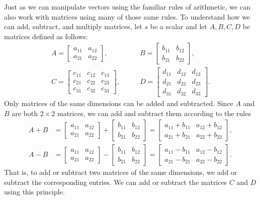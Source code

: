 Just as we can manipulate vectors using the familiar rules of
arithmetic, we can also work with matrices using many of those same
rules. To understand how we can add, subtract, and multiply matrices,
let $s$ be a scalar and let $A,B,C,D$ be matrices defined as follows:
%
\begin{align*}
A
=
\begin{bmatrix}
a_{11} & a_{12} \\
a_{21} & a_{22}
\end{bmatrix},
&\qquad
B
=
\begin{bmatrix}
b_{11} & b_{12} \\
b_{21} & b_{22}
\end{bmatrix}, \\[4pt]
%
C
=
\begin{bmatrix}
c_{11} & c_{12} & c_{13} \\
c_{21} & c_{22} & c_{23} \\
c_{31} & c_{32} & c_{33}
\end{bmatrix},
&\qquad
D
=
\begin{bmatrix}
d_{11} & d_{12} & d_{13} \\
d_{21} & d_{22} & d_{23} \\
d_{31} & d_{32} & d_{33}
\end{bmatrix}.
\end{align*}
%
Only matrices of the same dimensions can be added and
subtracted. Since $A$ and $B$ are both $2 \times 2$ matrices, we can
add and subtract them according to the rules
%
\begin{align*}
A + B
&=
\begin{bmatrix}
a_{11} & a_{12} \\
a_{21} & a_{22}
\end{bmatrix}
+
\begin{bmatrix}
b_{11} & b_{12} \\
b_{21} & b_{22}
\end{bmatrix}
=
\begin{bmatrix}
a_{11} + b_{11} & a_{12} + b_{12} \\
a_{21} + b_{21} & a_{22} + b_{22}
\end{bmatrix}, \\[4pt]
%
A - B
&=
\begin{bmatrix}
a_{11} & a_{12} \\
a_{21} & a_{22}
\end{bmatrix}
-
\begin{bmatrix}
b_{11} & b_{12} \\
b_{21} & b_{22}
\end{bmatrix}
=
\begin{bmatrix}
a_{11} - b_{11} & a_{12} - b_{12} \\
a_{21} - b_{21} & a_{22} - b_{22}
\end{bmatrix}.
\end{align*}
%
That is, to add or subtract two matrices of the same dimensions, we
add or subtract the corresponding entries. We can add or subtract the
matrices $C$ and $D$ using this principle.

